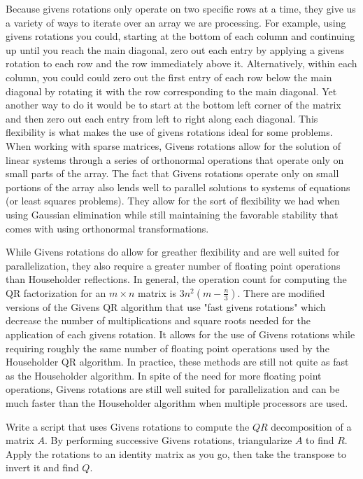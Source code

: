 Because givens rotations only operate on two specific rows at a time, they give us a variety of ways to iterate over an array we are processing.
For example, using givens rotations you could, starting at the bottom of each column and continuing up until you reach the main diagonal, zero out each entry by applying a givens rotation to each row and the row immediately above it.
Alternatively, within each column, you could could zero out the first entry of each row below the main diagonal by rotating it with the row corresponding to the main diagonal.
Yet another way to do it would be to start at the bottom left corner of the matrix and then zero out each entry from left to right along each diagonal.
This flexibility is what makes the use of givens rotations ideal for some problems.
When working with sparse matrices, Givens rotations allow for the solution of linear systems through a series of orthonormal operations that operate only on small parts of the array.
The fact that Givens rotations operate only on small portions of the array also lends well to parallel solutions to systems of equations (or least squares problems).
They allow for the sort of flexibility we had when using Gaussian elimination while still maintaining the favorable stability that comes with using orthonormal transformations.

While Givens rotations do allow for greather flexibility and are well suited for parallelization, they also require a greater number of floating point operations than Householder reflections.
In general, the operation count for computing the QR factorization for an $m \times n$ matrix is $3 n^2 \left( m - \frac{n}{3} \right)$.
There are modified versions of the Givens QR algorithm that use "fast givens rotations" which decrease the number of multiplications and square roots needed for the application of each givens rotation.
It allows for the use of Givens rotations while requiring roughly the same number of floating point operations used by the Householder QR algorithm.
In practice, these methods are still not quite as fast as the Householder algorithm.
In spite of the need for more floating point operations, Givens rotations are still well suited for parallelization and can be much faster than the Householder algorithm when multiple processors are used.

\begin{problem}
Write a script that uses Givens rotations to compute the $QR$ decomposition of a matrix $A$.
By performing successive Givens rotations, triangularize $A$ to find $R$.
Apply the rotations to an identity matrix as you go, then take the transpose to invert it and find $Q$.
\end{problem}